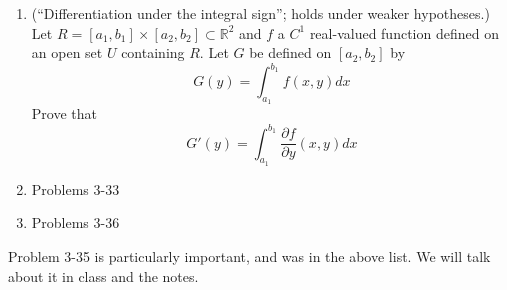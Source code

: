 \documentclass[11pt]{amsart}
\newcommand{\bbR}{\mathbb{R}}
\theoremstyle{definition}
\begin{document}
\begin{enumerate}[wide, labelwidth=!, labelindent=0pt]
\item (``Differentiation under the integral sign''; holds under weaker hypotheses.) Let $R=[a_1,b_1] \times [a_2,b_2] \subset \bbR^2$ and $f$ a $C^1$ real-valued function defined on an open set $U$ containing $R$. Let $G$ be defined on $[a_2,b_2]$ by
\[
G(y)=\int_{a_1}^{b_1} f(x,y)dx 
\]
Prove that
\[
G'(y)=\int_{a_1}^{b_1} \frac{\partial f}{\partial y} (x,y)dx 
\]

\item Problems 3-33 

\item Problems 3-36

 \end{enumerate}

Problem 3-35 is particularly important, and was in the above list. We will talk about it in class and the notes.
\end{document}

